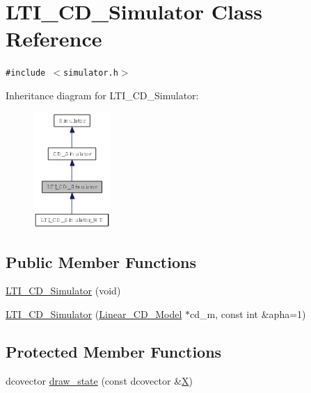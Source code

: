 \hypertarget{class_l_t_i___c_d___simulator}{
\section{LTI\_\-CD\_\-Simulator Class Reference}
\label{class_l_t_i___c_d___simulator}
}
{\tt \#include $<$simulator.h$>$}

Inheritance diagram for LTI\_\-CD\_\-Simulator:\nopagebreak
\begin{figure}[H]
\begin{center}
\leavevmode
\includegraphics[width=83pt]{class_l_t_i___c_d___simulator__inherit__graph}
\end{center}
\end{figure}
\subsection*{Public Member Functions}
\begin{CompactItemize}
\item 
\hyperlink{class_l_t_i___c_d___simulator_86b38b889838a1efdec15f1f18fd55f3}{LTI\_\-CD\_\-Simulator} (void)
\item 
\hyperlink{class_l_t_i___c_d___simulator_3126a80b8ca7eaec68232e470d0c0595}{LTI\_\-CD\_\-Simulator} (\hyperlink{class_linear___c_d___model}{Linear\_\-CD\_\-Model} $\ast$cd\_\-m, const int \&apha=1)
\end{CompactItemize}
\subsection*{Protected Member Functions}
\begin{CompactItemize}
\item 
dcovector \hyperlink{class_l_t_i___c_d___simulator_1497e233ff1a0d71c2b660fe270c9ff8}{draw\_\-state} (const dcovector \&\hyperlink{class_simulator_a2db8ace19099d996be516022d230bc0}{X})
\end{CompactItemize}


